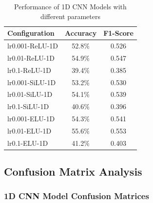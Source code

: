 \begin{table}[h]
\centering
\caption{Performance of 1D CNN Models with different parameters}
\label{tab:1d_results}
\begin{tabular}{@{}lcc@{}}
\toprule
\textbf{Configuration} & \textbf{Accuracy} & \textbf{F1-Score} \\
\midrule
lr0.001-ReLU-1D & 52.8\% & 0.526 \\
lr0.01-ReLU-1D & 54.9\% & 0.547 \\
lr0.1-ReLU-1D & 39.4\% & 0.385 \\
lr0.001-SiLU-1D & 53.2\% & 0.530 \\
lr0.01-SiLU-1D & 54.1\% & 0.539 \\
lr0.1-SiLU-1D & 40.6\% & 0.396 \\
lr0.001-ELU-1D & 54.3\% & 0.541 \\
lr0.01-ELU-1D & 55.6\% & 0.553 \\
lr0.1-ELU-1D & 41.2\% & 0.403 \\
\bottomrule
\end{tabular}
\end{table}

\subsection{Confusion Matrix Analysis}

\subsubsection{1D CNN Model Confusion Matrices}

